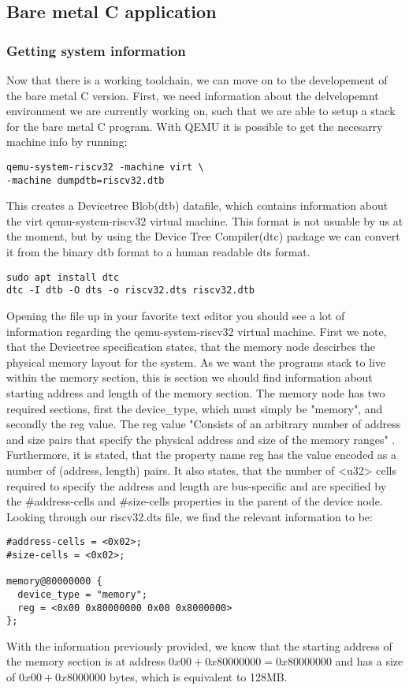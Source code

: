 \subsection{Bare metal C application}
\subsubsection{Getting system information}
Now that there is a working toolchain, we can move on to the developement of the
bare metal C version. First, we need information about the delvelopemnt
environment we are currently working on, such that we are able to setup a stack
for the bare metal C program. With QEMU it is possible to get the necesarry
machine info by running:
\begin{lstlisting}
qemu-system-riscv32 -machine virt \
-machine dumpdtb=riscv32.dtb
\end{lstlisting}
This creates a Devicetree Blob(dtb) datafile, which contains information about
the virt qemu-system-riscv32 virtual machine. This format is not usuable by us
at the moment, but by using the Device Tree Compiler(dtc) package we can convert
it from the binary dtb format to a human readable dts format.
\begin{lstlisting}
sudo apt install dtc
dtc -I dtb -O dts -o riscv32.dts riscv32.dtb
\end{lstlisting}
Opening the file up in your favorite text editor you should see a lot of
information regarding the qemu-system-riscv32 virtual machine. First we note,
that the Devicetree specification states, that the memory node descirbes the
physical memory layout for the system. As we want the programs stack
to live within the memory section, this is section we should find information
about starting address and length of the memory section. The memory node has
two required sections, first the device\_type, which must simply be "memory", and
secondly the reg value. The reg value "Consists of an arbitrary number of
address and size pairs that specify the physical address and size of the memory
ranges"\cite{DTS} . Furthermore, it is stated, that the property name reg has
the value encoded as a number of (address, length) pairs. It also states, that
the number of <u32> cells required to specify the address and length are
bus-specific and are specified by the \#address-cells and \#size-cells properties
in the parent of the device node.
Looking through our riscv32.dts file, we find the relevant information to be:
\begin{lstlisting}
#address-cells = <0x02>;
#size-cells = <0x02>;

memory@80000000 {
  device_type = "memory";
  reg = <0x00 0x80000000 0x00 0x8000000>
};
\end{lstlisting}
With the information previously provided, we know that the starting
address of the memory section is at address $0x00 + 0x80000000 = 0x80000000$ and has a size of
$0x00 + 0x8000000$ bytes, which is equivalent to 128MB.


